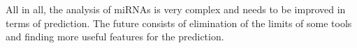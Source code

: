 \documentclass[12pt,  a4paper]{report}
\begin{document}
All in all, the analysis of miRNAs is very complex and needs to be improved in terms of prediction. The future consists of elimination of the limits of some tools and finding more useful features for the prediction.






\listoffigures
\listoftables




\end{document}
